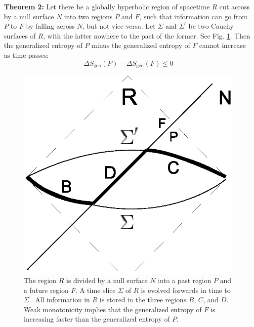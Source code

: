 \documentclass{article}
\begin{document}
\textbf{Theorem 2:} Let there be a globally hyperbolic region of spacetime $R$ cut across by a null surface $N$ into two regions $P$ and $F$, such that information can go from $P$ to $F$ by falling across $N$, but not vice versa.  Let $\Sigma$ and $\Sigma^\prime$ be two Cauchy surfaces of $R$, with the latter nowhere to the past of the former.  See Fig. \ref{thm2}.  Then the generalized entropy of $P$ minus the generalized entropy of $F$ cannot increase as time passes:
\begin{equation}\label{PminusF}
\Delta S_\mathrm{gen}(P) - \Delta S_\mathrm{gen}(F) \le 0
\end{equation}
\begin{figure}[ht]
\centering
\includegraphics[width=.5\textwidth]{thm2.eps}
\caption{\small{
The region $R$ is divided by a null surface $N$ into a past region $P$ and a future region $F$.  A time slice $\Sigma$ of $R$ is evolved forwards in time to $\Sigma^\prime$.  All information in $R$ is stored in the three regions $B$, $C$, and $D$.  Weak monotonicity implies that the generalized entropy of $F$ is increasing faster than the generalized entropy of $P$.
}}\label{thm2}
\end{figure}
\end{document}
